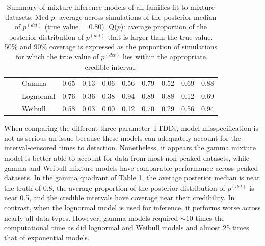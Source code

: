 \documentclass[12pt]{article}
\newcommand{\pdet}{p^{(det)}}
\begin{document}
\begin{table}[ht]
\begin{tabular}{l|l|l|cccc|cccc}
\cline{2-11}
& \parbox[t]{2mm}{} & Gamma & 0.65 & 0.13 & 0.06 & 0.56 & 0.79 & 0.52 & 0.69 & 0.88 \\ 
& &   Lognormal & 0.76 & 0.36 & 0.38 & 0.94 & 0.89 & 0.88 & 0.12 & 0.69 \\ 
& &   Weibull & 0.58 & 0.03 & 0.00 & 0.12 & 0.70 & 0.29 & 0.56 & 0.94 \\ 
   \hline
\end{tabular}
\caption{Summary of mixture inference models of all families fit to mixture datasets.  
Med $p$: average across simulations of the posterior median of $\pdet$ (true value = 0.80).  
Q($p$): average proportion of the posterior distribution of $\pdet$ that is larger than the true value.  
50\% and 90\% coverage is expressed as the proportion of simulations for which the true value of $\pdet$ lies within the appropriate credible interval.}
\label{tbl:sim2}
\end{table}
\fi

When comparing the different three-parameter TTDDs, model misspecification is not as serious an issue because these models can adequately account for the interval-censored times to detection. 
Nonetheless, it appears the gamma mixture model is better able to account for data from most non-peaked datasets, while gamma and Weibull mixture models have comparable performance across peaked datasets. 
In the gamma quadrant of Table \ref{tbl:sim2}, the average posterior median is near the truth of 0.8, the average proportion of the posterior distribution of $\pdet$ is near 0.5, and the credible intervals have coverage near their credibility. 
In contrast, when the lognormal model is used for inference, it performs worse across nearly all data types.
However, gamma models required $\sim 10$ times the computational time as did lognormal and Weibull models and almost 25 times that of exponential models.

\end{document}
